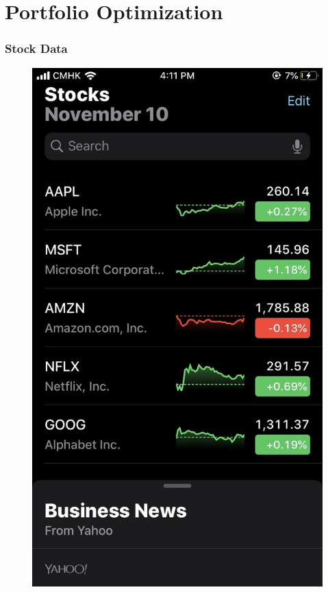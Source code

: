 \documentclass{beamer}
\begin{document}
	\setcounter{showSlideNumbers}{0}
        \section{Portfolio Optimization}
	\setcounter{framenumber}{0}
	\setcounter{showProgressBar}{1}
	\setcounter{showSlideNumbers}{1}

  \begin{frame}
    \frametitle{Stock Data}
    \vspace{.8cm}
    \begin{figure}[!htb]
      \includegraphics[scale=.18]{images/phone_stocks.jpg}
    \end{figure}
  \end{frame}
\end{document}
